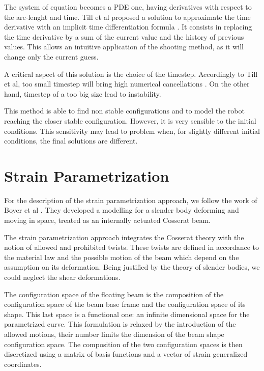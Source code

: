 \documentclass{thesisreport}
\begin{document}
 The system of equation becomes a PDE one, having derivatives with respect to the arc-lenght and time. Till et al proposed a solution to approximate the time derivative with an implicit time differentiation formula \cite{till_real-time_2019}. It consists in replacing the time derivative by a sum of the current value and the history of previous values. This allows an intuitive application of the shooting method, as it will change only the current guess. 
 
 A critical aspect of this solution is the choice of the timestep. Accordingly to Till et al, too small timestep will bring high numerical cancellations \cite{till_real-time_2019}. On the other hand, timestep of a too big size lead to instability. 
 
 This method is able to find non stable configurations and to model the robot reaching the closer stable configuration. However, it is very sensible to the initial conditions. This sensitivity may lead to problem when, for slightly different initial conditions, the final solutions are different. 
 
 
 \section{Strain Parametrization}
 
 For the description of the strain parametrization approach, we follow the work of Boyer et al \cite{boyer_dynamics_2019}. They developed a modelling for a slender body deforming and moving in space, treated as an internally actuated Cosserat beam.
 
 The strain parametrization approach integrates the Cosserat theory with the notion of allowed and prohibited twists. These twists are defined in accordance to the material law and the possible motion of the beam which depend on the assumption on its deformation. Being justified by the theory of slender bodies, we could neglect the shear deformations.
 
 The configuration space of the floating beam is the composition of the configuration space of the beam base frame and the configuration space of its shape. This last space is a functional one: an infinite dimensional space for the parametrized curve. 
 This formulation is relaxed by the introduction of the allowed motions, their number limits the dimension of the beam shape configuration space. 
 The composition of the two configuration spaces is then discretized using a matrix of basis functions and a vector of strain generalized coordinates. 
 
\end{document}
